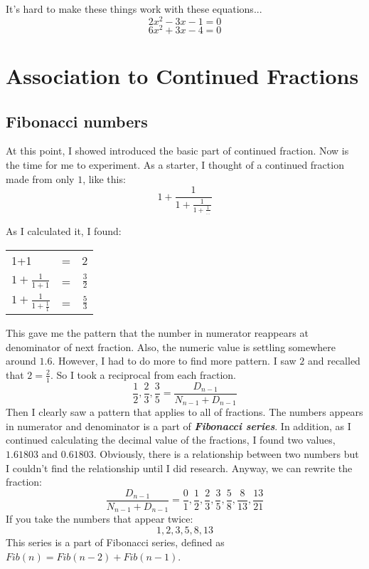 \documentclass{jreport}
\begin{document}
It's hard to make these things work with these equations...
\[2x^2-3x-1=0\]\[6x^2+3x-4=0\]

\pagebreak

\chapter*{Association to Continued Fractions}

\section*{Fibonacci numbers}

At this point, I showed introduced the basic part of continued fraction. Now is the time for me to experiment. As a starter, I thought of a continued fraction made from only $1$, like this:
\[1+\frac{1}{1+\frac{1}{1+\frac{1}{...}}}\]

As I calculated it, I found:
\begin{table}[htbp]
\begin{center}
\begin{tabular}{|lcr|}
\hline
1+1 & = & 2\\
$1+\frac{1}{1+1}$ & = & $\frac{3}{2}$\\
$1+\frac{1}{1+\frac{1}{1}}$ & = & $\frac{5}{3}$\\
\hline
\end{tabular}
\end{center}
\end{table}

This gave me the pattern that the number in numerator reappears at denominator of next fraction. Also, the numeric value is settling somewhere around $1.6$. However, I had to do more to find more pattern. I saw $2$ and recalled that $2=\frac{2}{1}$. So I took a reciprocal from each fraction.
\[\frac{1}{2},\frac{2}{3},\frac{3}{5} = \frac{D_{n-1}}{N_{n-1}+D_{n-1}}\]
Then I clearly saw a pattern that applies to all of fractions. The numbers appears in numerator and denominator is a part of \textbf{\textit{Fibonacci series}}. In addition, as I continued calculating the decimal value of the fractions, I found two values, $1.61803$ and $0.61803$. Obviously, there is a relationship between two numbers but I couldn't find the relationship until I did research. Anyway, we can rewrite the fraction:
\[\frac{D_{n-1}}{N_{n-1}+D_{n-1}} = \frac{0}{1},\frac{1}{2},\frac{2}{3},\frac{3}{5},\frac{5}{8},\frac{8}{13},\frac{13}{21}\]
If you take the numbers that appear twice:
\[1,2,3,5,8,13\]
This series is a part of Fibonacci series, defined as $Fib(n)=Fib(n-2)+Fib(n-1)$.
\end{document}
